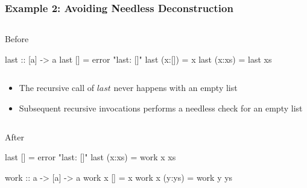 \documentclass[smaller]{beamer}
\newcommand{\Varid}[1]{\mathit{#1}}
\begin{document}
\begin{frame}[fragile]
\frametitle{Example 2: Avoiding Needless Deconstruction}

\begin{columns}[t]
\begin{column}{0.8\textwidth}
\begin{block}{Before}
{\footnotesize\begin{semiverbatim}
\alert{last       :: [a] -> a}
last []       = error "last: []"
last (x:[])   = x
last (x:xs)   = last xs
\end{semiverbatim}}
\end{block}
\end{column}
\end{columns}

\vskip 0.2in
\begin{itemize}
\item The recursive call of \ensuremath{\Varid{last}} never happens with an empty list
\item Subsequent recursive invocations performs a needless check for an empty list
\end{itemize}
\begin{columns}[t]
\begin{column}{0.8\textwidth}
\begin{block}{After}
{\footnotesize\begin{semiverbatim}
last []     = error "last: []"
last (x:xs) = work x xs

\alert{work :: a -> [a] -> a}
work x []     = x
work x (y:ys) = work y ys
\end{semiverbatim}}
\end{block}
\end{column}
\end{columns}

\end{frame}
\end{document}
